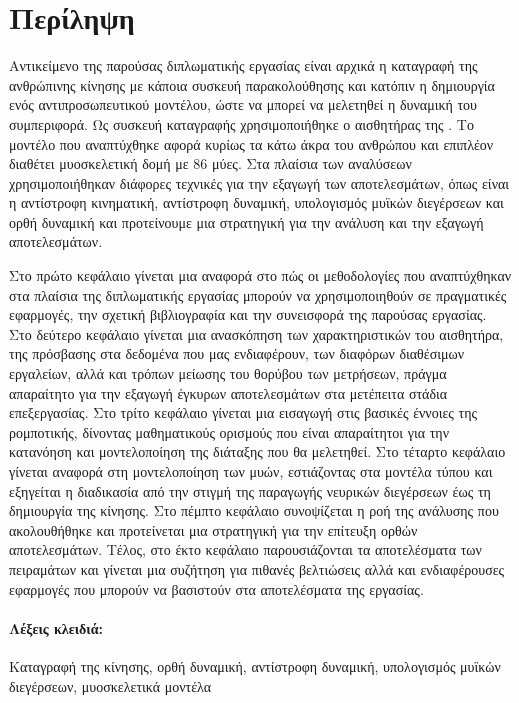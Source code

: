 \section*{Περίληψη}

Αντικείμενο της παρούσας διπλωματικής εργασίας είναι αρχικά η καταγραφή της ανθρώπινης κίνησης με κάποια συσκευή παρακολούθησης και κατόπιν η δημιουργία ενός αντιπροσωπευτικού μοντέλου, ώστε να μπορεί να μελετηθεί η δυναμική του συμπεριφορά. Ως συσκευή καταγραφής χρησιμοποιήθηκε ο αισθητήρας  της . Το μοντέλο που αναπτύχθηκε αφορά κυρίως τα κάτω άκρα του ανθρώπου και επιπλέον διαθέτει μυοσκελετική δομή με 86 μύες. Στα πλαίσια των αναλύσεων χρησιμοποιήθηκαν διάφορες τεχνικές για την εξαγωγή των αποτελεσμάτων, όπως είναι η αντίστροφη κινηματική, αντίστροφη δυναμική, υπολογισμός μυϊκών διεγέρσεων και ορθή δυναμική και προτείνουμε μια στρατηγική για την ανάλυση και την εξαγωγή αποτελεσμάτων.

Στο πρώτο κεφάλαιο γίνεται μια αναφορά στο πώς οι μεθοδολογίες που αναπτύχθηκαν στα πλαίσια της διπλωματικής εργασίας μπορούν να χρησιμοποιηθούν σε πραγματικές εφαρμογές, την σχετική βιβλιογραφία και την συνεισφορά της παρούσας εργασίας. Στο δεύτερο κεφάλαιο γίνεται μια ανασκόπηση των χαρακτηριστικών του αισθητήρα, της πρόσβασης στα δεδομένα που μας ενδιαφέρουν, των διαφόρων διαθέσιμων εργαλείων, αλλά και τρόπων μείωσης του θορύβου των μετρήσεων, πράγμα απαραίτητο για την εξαγωγή έγκυρων αποτελεσμάτων στα μετέπειτα στάδια επεξεργασίας. Στο τρίτο κεφάλαιο γίνεται μια εισαγωγή στις βασικές έννοιες της ρομποτικής, δίνοντας μαθηματικούς ορισμούς που είναι απαραίτητοι για την κατανόηση και μοντελοποίηση της διάταξης που θα μελετηθεί. Στο τέταρτο κεφάλαιο γίνεται αναφορά στη μοντελοποίηση των μυών, εστιάζοντας στα μοντέλα τύπου  και εξηγείται η διαδικασία από την στιγμή της παραγωγής νευρικών διεγέρσεων έως τη δημιουργία της κίνησης. Στο πέμπτο κεφάλαιο συνοψίζεται η ροή της ανάλυσης που ακολουθήθηκε και προτείνεται μια στρατηγική για την επίτευξη ορθών αποτελεσμάτων. Τέλος, στο έκτο κεφάλαιο παρουσιάζονται τα αποτελέσματα των πειραμάτων και γίνεται μια συζήτηση για πιθανές βελτιώσεις αλλά και ενδιαφέρουσες εφαρμογές που μπορούν να βασιστούν στα αποτελέσματα της εργασίας.

\vfill

\paragraph{\textbf{Λέξεις κλειδιά:}}Καταγραφή της κίνησης, ορθή δυναμική, αντίστροφη δυναμική, υπολογισμός μυϊκών διεγέρσεων, μυοσκελετικά μοντέλα

